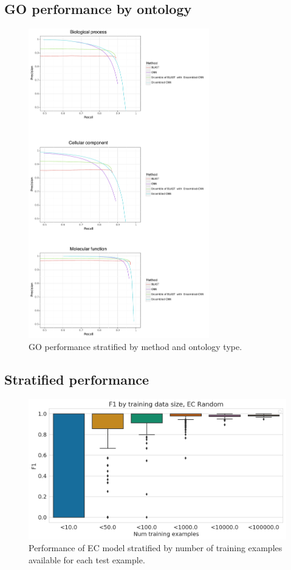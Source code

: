 \subsection{GO performance by ontology}
\begin{figure}[htbp]
\centering
  \includegraphics[width=0.7\textwidth]{combined_split_go_random.pdf}
  \caption{GO performance stratified by method and ontology type.}
  \label{sup:fig:go_ontologies}
\end{figure}

\clearpage
\subsection{Stratified performance}
\begin{figure}[htbp]
\centering
  \includegraphics[width=\textwidth]{ec_f1_by_training_size.png}
  \caption{Performance of EC model stratified by number of training examples available for each test example.}
  \label{sup:fig:ec_f1_by_training_size}
\end{figure}


